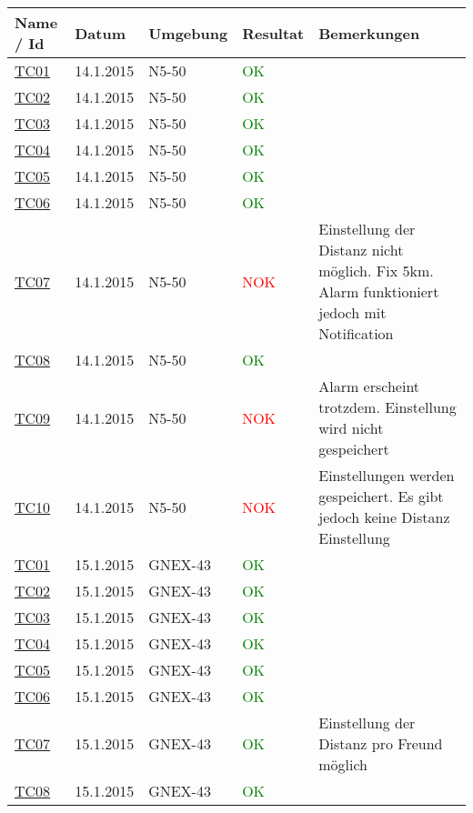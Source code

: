 \begin{center}
	\begin{tabular}{ | l | l | l | l | p{7cm} | }
	\hline
	Name / Id & Datum & Umgebung & Resultat & Bemerkungen \\
	\hline
	\hyperlink{TC01}{TC01} & 14.1.2015 & N5-50 & \textcolor{green}{OK} & \\
	\hline
	\hyperlink{TC02}{TC02} & 14.1.2015 & N5-50 & \textcolor{green}{OK} & \\
	\hline
	\hyperlink{TC03}{TC03} & 14.1.2015 & N5-50 & \textcolor{green}{OK} & \\
	\hline
	\hyperlink{TC04}{TC04} & 14.1.2015 & N5-50 & \textcolor{green}{OK} & \\
	\hline
	\hyperlink{TC05}{TC05} & 14.1.2015 & N5-50 & \textcolor{green}{OK} & \\
	\hline
	\hyperlink{TC06}{TC06} & 14.1.2015 & N5-50 & \textcolor{green}{OK} & \\
	\hline
	\hyperlink{TC07}{TC07} & 14.1.2015 & N5-50 & \textcolor{red}{NOK} & Einstellung der Distanz nicht möglich. Fix 5km. Alarm funktioniert jedoch mit Notification \\
	\hline
	\hyperlink{TC08}{TC08} & 14.1.2015 & N5-50 & \textcolor{green}{OK} & \\
	\hline
	\hyperlink{TC09}{TC09} & 14.1.2015 & N5-50 & \textcolor{red}{NOK} & Alarm erscheint trotzdem. Einstellung wird nicht gespeichert\\
	\hline
	\hyperlink{TC10}{TC10} & 14.1.2015 & N5-50 & \textcolor{red}{NOK} & Einstellungen werden gespeichert. Es gibt jedoch keine Distanz Einstellung\\
	\hline
	\hyperlink{TC01}{TC01} & 15.1.2015 & GNEX-43 & \textcolor{green}{OK} & \\
	\hline
	\hyperlink{TC02}{TC02} & 15.1.2015 & GNEX-43 & \textcolor{green}{OK} & \\
	\hline
	\hyperlink{TC03}{TC03} & 15.1.2015 & GNEX-43 & \textcolor{green}{OK} & \\
	\hline
	\hyperlink{TC04}{TC04} & 15.1.2015 & GNEX-43 & \textcolor{green}{OK} & \\
	\hline
	\hyperlink{TC05}{TC05} & 15.1.2015 & GNEX-43 & \textcolor{green}{OK} & \\
	\hline
	\hyperlink{TC06}{TC06} & 15.1.2015 & GNEX-43 & \textcolor{green}{OK} & \\
	\hline
	\hyperlink{TC07}{TC07} & 15.1.2015 & GNEX-43 & \textcolor{green}{OK} & Einstellung der Distanz pro Freund möglich \\
	\hline
	\hyperlink{TC08}{TC08} & 15.1.2015 & GNEX-43 & \textcolor{green}{OK} & \\

\end{tabular}
\end{center}
